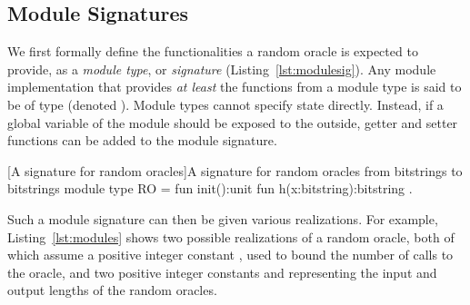 \subsection{Module Signatures}
We first formally define the functionalities a random oracle is expected to
provide, as a \emph{module type}, or \emph{signature}
(Listing~\ref{lst:modulesig}). Any module implementation  that provides
\emph{at least} the functions from a module type  is said to be of
type  (denoted ). Module types cannot specify state
directly. Instead, if a global variable of the module should be exposed to the
outside, getter and setter functions can be added to the module signature.

\begin{easycrypt}[label={lst:modulesig}]{[A signature for random oracles]A signature for random oracles from bitstrings to bitstrings}
module type RO = {
  fun init():unit
  fun h(x:bitstring):bitstring }.
\end{easycrypt}

Such a module signature can then be given various realizations. For example, Listing~\ref{lst:modules} shows two possible realizations of a random oracle, both of which assume a positive integer constant , used to bound the number of calls to the oracle, and two positive integer constants  and  representing the input and output lengths of the random oracles.

